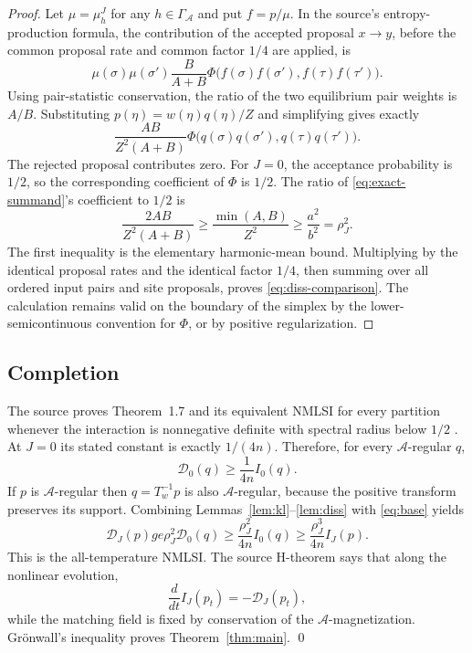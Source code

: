 \documentclass[11pt]{article}
\newcommand{\cD}{\mathcal D}
\newcommand{\cA}{\mathcal A}
\begin{document}
\begin{proof}
Let $\mu=\mu^J_h$ for any $h\in\Gamma_{\cA}$ and put $f=p/\mu$.
In the source's entropy-production formula, the contribution of the accepted
proposal $x\to y$, before the common proposal rate and common factor $1/4$
are applied, is
\[
 \mu(\sigma)\mu(\sigma')\frac{B}{A+B}
 \Phi\bigl(f(\sigma)f(\sigma'),f(\tau)f(\tau')\bigr).
\]
Using pair-statistic conservation, the ratio of the two equilibrium pair
weights is $A/B$.  Substituting
$p(\eta)=w(\eta)q(\eta)/Z$ and simplifying gives exactly
\begin{equation}\label{eq:exact-summand}
 \frac{AB}{Z^2(A+B)}
 \Phi\bigl(q(\sigma)q(\sigma'),q(\tau)q(\tau')\bigr).
\end{equation}
The rejected proposal contributes zero.  For $J=0$, the acceptance
probability is $1/2$, so the corresponding coefficient of $\Phi$ is $1/2$.
The ratio of \eqref{eq:exact-summand}'s coefficient to $1/2$ is
\[
 \frac{2AB}{Z^2(A+B)}
 \ge \frac{\min(A,B)}{Z^2}
 \ge \frac{a^2}{b^2}=\rho_J^2.
\]
The first inequality is the elementary harmonic-mean bound.  Multiplying by
the identical proposal rates and the identical factor $1/4$, then summing
over all ordered input pairs and site proposals, proves
\eqref{eq:diss-comparison}.  The calculation remains valid on the boundary
of the simplex by the lower-semicontinuous convention for $\Phi$, or by
positive regularization.
\end{proof}

\subsection{Completion}

The source proves Theorem~1.7 and its equivalent NMLSI for every partition
whenever the interaction is nonnegative definite with spectral radius below
$1/2$ \cite{source}.  At $J=0$ its stated constant is exactly $1/(4n)$.
Therefore, for every $\cA$-regular $q$,
\begin{equation}\label{eq:base}
 \cD_0(q)\ge\frac1{4n}I_0(q).
\end{equation}
If $p$ is $\cA$-regular then $q=T_w^{-1}p$ is also $\cA$-regular, because
the positive transform preserves its support.  Combining
Lemmas~\ref{lem:kl}--\ref{lem:diss} with \eqref{eq:base} yields
\[
 \cD_J(p)ge\rho_J^2\cD_0(q)
 \ge\frac{\rho_J^2}{4n}I_0(q)
 \ge\frac{\rho_J^3}{4n}I_J(p).
\]
This is the all-temperature NMLSI.  The source H-theorem says that along the
nonlinear evolution,
\[
 \frac{d}{dt}I_J(p_t)=-\cD_J(p_t),
\]
while the matching field is fixed by conservation of the $\cA$-magnetization.
Gr\"onwall's inequality proves Theorem~\ref{thm:main}.
\qed
\end{document}
